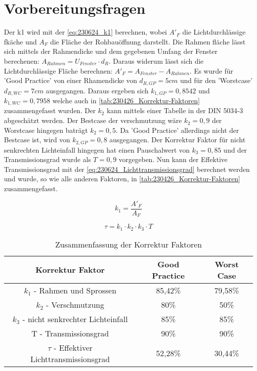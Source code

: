 \section{Vorbereitungsfragen}
\label{sec:Vorbereitungsfragen}

Der k1 wird mit der \autoref{eq:230624_k1} berechnen, wobei $A'_F$ die Lichtdurchlässige fkäche und $A_F$ die Fläche der Rohbauöffnung darstellt.
Die Rahmen fläche lässt sich mittels der Rahmendicke und dem gegebenen Umfang der Fenster berechenen: $A_{Rahmen} = U_{Fenster} \cdot d_R$. 
Daraus widerum lässt sich die Lichtdurchlässige Fläche berechnen:  $A'_F = A_{Fenster} - A_{Rahmen}$.
Es wurde für 'Good Practice' von einer Rhamendicke von $d_{R,GP} = 5cm$ und für den 'Worstcase' $d_{R,WC} = 7 cm$ ausgegangen.
Daraus ergeben sich $k_{1,GP} = 0,8542$ und $k_{1,WC} = 0,7958$ welche auch in \autoref{tab:230426_Korrektur-Faktoren} zusammengefasst wurden.
Der $k_2$ kann mittels einer Tabelle in der DIN 5034-3 abgeschätzt werden.
Der Bestcase der verschmutzung wäre $k_2 = 0,9$ der Worstcase hingegen baträgt $k_2 = 0,5$.
Da 'Good Practice' allerdings nicht der Bestcase ist, wird von $k_{2,GP} = 0,8$ ausgegangen.
Der Korrektur Faktor für nicht senkrechten Lichteinfall hingegen hat einen Pauschalwert von $k_3 = 0,85$ und der Transmissionsgrad wurde als $T = 0,9$ vorgegeben.
Nun kann der Effektive Transmissionsgrad mit der \autoref{eq:230624_Lichttransmissionsgrad} berechnet werden und wurde, so wie alle anderen Faktoren, in \autoref{tab:230426_Korrektur-Faktoren} zusammengefasst.


\begin{equation}
    k_1 = \frac{A'_F}{A_F}
    \label{eq:230624_k1}
\end{equation}

\begin{equation}
    \tau = k_1 \cdot k_2 \cdot k_3 \cdot T
    \label{eq:230624_Lichttransmissionsgrad}
\end{equation}


\begin{table}[H]
    \caption{Zusammenfassung der Korrektur Faktoren}
    \centering
    \begin{tabular}{|c|c|c|}
    \hline
    \rowcolor[HTML]{70AD47} 
    Korrektur Faktor                                & Good Practice & Worst Case \\\hline
    \rowcolor[HTML]{CFE5A8} 
    $k_1$ - Rahmen und Sprossen                     & 85,42\%       & 79,58\%    \\\hline
    \rowcolor[HTML]{A9D08E} 
    $k_2$ - Verschmutzung                           & 80\%          & 50\%       \\\hline
    \rowcolor[HTML]{CFE5A8} 
    $k_3$ - nicht senkrechter Lichteinfall          & 85\%          & 85\%       \\\hline
    \rowcolor[HTML]{A9D08E} 
    T - Transmissionsgrad                           & 90\%          & 90\%       \\\hline
    \rowcolor[HTML]{CFE5A8} 
    $\tau$ - Effektiver Lichttransmissionsgrad      & 52,28\%       & 30,44\%   \\\hline
    \end{tabular}
    \label{tab:230426_Korrektur-Faktoren}
\end{table}
